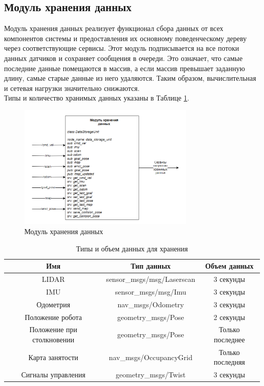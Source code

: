\subsection{Модуль хранения данных}

Модуль хранения данных реализует функционал сбора данных от всех компонентов системы и предоставления их основному поведенческому дереву через соответствующие сервисы. Этот модуль подписывается на все потоки данных датчиков и сохраняет сообщения в очереди. Это означает, что самые последние данные помещаются в массив, а если массив превышает заданную длину, самые старые данные из него удаляются. Таким образом, вычислительная и сетевая нагрузки значительно снижаются. \\
Типы и количество хранимых данных указаны в Таблице \ref*{tab:data_storage}.

\begin{figure}[h]
    \centering
    \includegraphics[width=0.75\textwidth]{images/chap_3/data_storage_unit.png}
    \caption{Модуль хранения данных}
    \label{fig:data_storage_unit}
\end{figure}

\begin{table}[]
    \centering
    \begin{tabular}{|c|c|c|}
    \hline
    \textbf{Имя} & \textbf{Тип данных} & \textbf{Объем данных} \\
    \hline
    LIDAR & sensor\_msgs/msg/Laserscan & 3 секунды \\
    \hline
    IMU & sensor\_msgs/msg/Imu & 3 секунды \\
    \hline
    Одометрия & nav\_msgs/Odometry & 3 секунды \\
    \hline
    Положение робота & geometry\_msgs/Pose & 2 секунды \\
    \hline
    Положение при столкновении & geometry\_msgs/Pose & Только последнее \\
    \hline
    Карта занятости & nav\_msgs/OccupancyGrid & Только последняя \\
    \hline
    Сигналы управления & geometry\_msgs/Twist & 3 секунды \\
    \hline
    \end{tabular}
    \caption{Типы и объем данных для хранения}
    \label{tab:data_storage}
\end{table}

